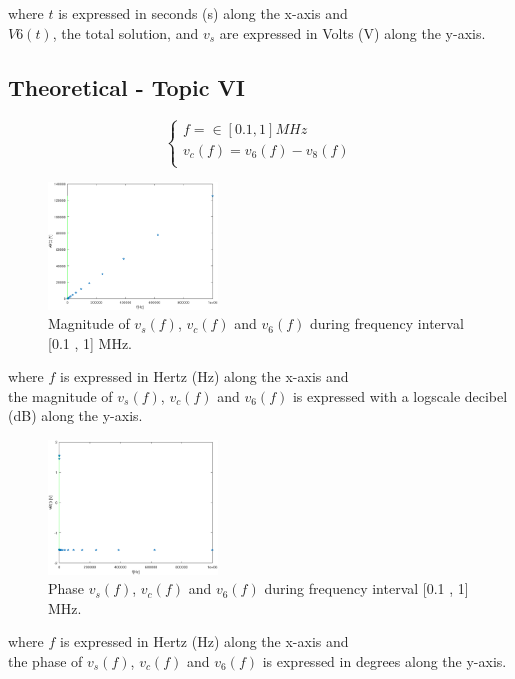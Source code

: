 where $t$ is expressed in seconds (s) along the x-axis and \\
$V6(t)$, the total solution, and $v_s$ are expressed in Volts (V) along the y-axis.
  

\subsection{Theoretical - Topic VI}
\label{subsec:sixth_topic}

\[
\left\{\begin{matrix}
f =\in [0.1 , 1] MHz \\
v_c(f)=v_6(f)-v_8(f) \\
\end{matrix}\right.
\]


\begin{figure}[H] \centering
\includegraphics[width=0.4\textwidth]{magnitude.eps}
\caption{Magnitude of $v_s(f)$,  $v_c(f)$  and $v_6(f)$ during frequency interval [0.1 , 1] MHz.}
\label{fig:LALALAAL}
\end{figure}

where $f$ is expressed in Hertz (Hz) along the x-axis and \\
the magnitude of $v_s(f)$,  $v_c(f)$  and $v_6(f)$ is expressed with a logscale decibel (dB) along the y-axis.

\begin{figure}[H] \centering
\includegraphics[width=0.4\textwidth]{phase.eps}
\caption{Phase $v_s(f)$,  $v_c(f)$  and $v_6(f)$ during frequency interval [0.1 , 1] MHz.}
\label{fig:LALALAAL}
\end{figure}

where $f$ is expressed in Hertz (Hz) along the x-axis and \\
the phase of $v_s(f)$,  $v_c(f)$  and $v_6(f)$ is expressed in degrees along the y-axis.

